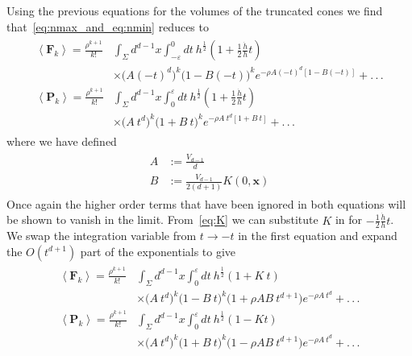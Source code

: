 \documentclass[12pt]{article}
\newcommand{\BF}[1]{\mathbf{F}_{#1}}
\newcommand{\BP}[1]{\mathbf{P}_{#1}}
\begin{document}
Using the previous equations for the volumes of the truncated cones we find that~\eqref{eq:nmax_and_eq:nmin} reduces to
\begin{gather}\label{eq:nmax_and_eq:nmin_volume_expanded}
\begin{aligned}
\left\langle \BF{k}\right\rangle = \frac{\rho^{k+1}}{k!} & \int_{\Sigma}d^{d-1}x\int_{-\varepsilon}^{0}dt\:
h^{\frac{1}{2}}\left (1+
\frac{1}{2}\frac{\dot{h}}{h}t\right)
 \\
 & \times \Big ( A (-t)^d \Big)^k 
 \Big ( 1 - B (-t) \Big)^k
 e^{-\rho A (-t)^d \left[1-B (-t) \right]} + .\,.\,.
\\
\left\langle \BP{k}\right\rangle = \frac{\rho^{k+1}}{k!} & \int_{\Sigma}d^{d-1}x\int_{0}^{\varepsilon}dt\:
h^{\frac{1}{2}}\left (1+
\frac{1}{2}\frac{\dot{h}}{h}t\right)
 \\
 & \times \Big ( A\: t^d \Big)^k 
 \Big ( 1 + B\: t \Big)^k
 e^{-\rho A\: t^d \left[1+B\: t \right]} + .\,.\,.
\end{aligned}
\end{gather}
where we have defined
\begin{gather}\label{A_and_B_defn}
\begin{aligned}
A & := \frac{V_{d-1}}{d} \\
B & := \frac{V_{d-1}}{2 (d+1)}K (0,\mathbf{x})
\end{aligned}
\end{gather}
Once again the higher order terms that have been ignored in both equations will be shown to vanish in the limit. From~\eqref{eq:K} we can substitute $K$ in for $-\frac{1}{2}\frac{\dot{h}}{h}t$. We swap the integration variable from $t\rightarrow -t$ in the first equation and expand the $O (t^{d+1})$ part of the exponentials to give
\begin{gather}\label{eq:nmax_and_eq:nmin_volume_expo_expanded}
\begin{aligned}
\left\langle \BF{k}\right\rangle = \frac{\rho^{k+1}}{k!} & \int_{\Sigma}d^{d-1}x\int_{0}^{\varepsilon}dt\:
h^{\frac{1}{2}}\left (1+
K\: t\right)
 \\
 & \times \Big ( A\: t^d \Big)^k 
 \Big ( 1 - B\: t \Big)^k
 \Big ( 1 + \rho A B\: t^{d+1} \Big)
 e^{-\rho A\: t^d} + .\,.\,.
\\
\left\langle \BP{k}\right\rangle = \frac{\rho^{k+1}}{k!} & \int_{\Sigma}d^{d-1}x\int_{0}^{\varepsilon}dt\:
h^{\frac{1}{2}}\left (1-
Kt\right)
 \\
 & \times \Big ( A\: t^d \Big)^k 
 \Big ( 1 + B\: t \Big)^k
  \Big ( 1 - \rho A B\: t^{d+1} \Big)
 e^{-\rho A\: t^d} + .\,.\,.
\end{aligned}
\end{gather}
\end{document}
